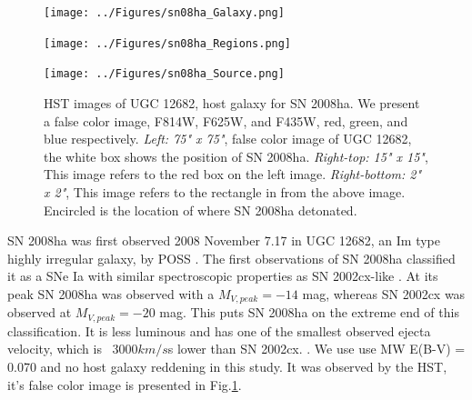 \documentclass[preprint]{aastex}
\begin{document}
\begin{centering}
	\begin{figure}
	\begin{minipage}[c][8cm]{.5\textwidth}
		\vspace*{\fill}
		\centering
		\texttt{[image: ../Figures/sn08ha\_Galaxy.png]}
			\label{fig:08hagal}
	\end{minipage}
	\begin{minipage}[c][8cm]{.5\textwidth}
		\vspace*{-.5cm}
		\centering
		\hspace*{-4.15cm}\texttt{[image: ../Figures/sn08ha\_Regions.png]}
			\label{fig:r08ha}\par
		\hspace*{-4.15cm}\texttt{[image: ../Figures/sn08ha\_Source.png]}
	\label{fig:s08ha}
	\end{minipage}
	\caption{HST images of UGC 12682, host galaxy for SN 2008ha. We present a false color image,
	 F814W, F625W, and F435W, red, green, and blue respectively. \textit{Left: 75" x 75"}, false color image of 
	UGC 12682, the white box shows the position of SN 2008ha. \textit{Right-top: 15" x 15"},
	This image refers to the red box on the left image. 
	\textit{Right-bottom: 2" x 2"}, This image refers to the rectangle in from the above image. 
	Encircled is the location of where SN 2008ha detonated.}
	\label{fig:08ha_whole}
	\end{figure}  
\end{centering}

SN 2008ha was first observed 2008 November 7.17 in UGC 12682, 
an Im type highly irregular galaxy, by POSS \citep{puc08}.
The first observations of SN 2008ha classified it as 
a SNe Ia with similar spectroscopic properties as SN 2002cx-like \citep{fol08}. 
At its peak SN 2008ha was observed with a $M_{V,peak} = -14$ mag, 
whereas SN 2002cx was observed at  $M_{V,peak} = -20$ mag. 
This puts SN 2008ha on the extreme end of this classification. 
It is less luminous and has one of the smallest observed ejecta velocity,
 which is ~3000$km/s$s lower than SN 2002cx. 
 \citep{fol09,fol1001,val09}.
We use use MW E(B-V) = 0.070 and no host galaxy reddening in this study. 
It was observed by the HST, it's false color image is presented in Fig.\ref{fig:08ha_whole}.
\end{document}

